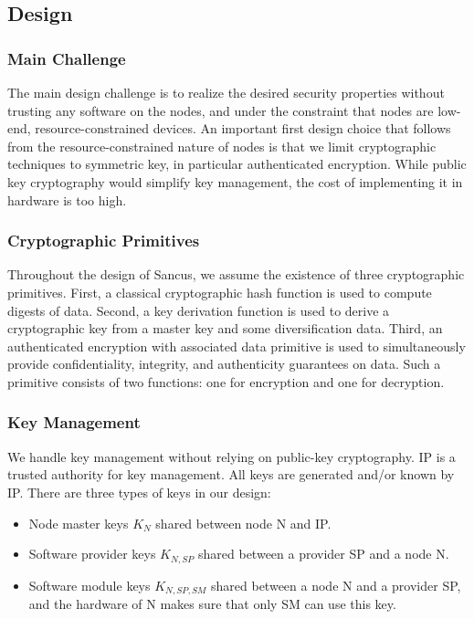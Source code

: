 \documentclass{article}
\begin{document}
\subsection{Design}

\subsubsection{Main Challenge}

The main design challenge is to realize the desired security properties without trusting any software on the nodes, and under the constraint that nodes are low-end, resource-constrained devices. An important first design choice that follows from the resource-constrained nature of nodes is that we limit cryptographic techniques to symmetric key, in particular authenticated encryption. While public key cryptography would simplify key management, the cost of implementing it in hardware is too high.

\subsubsection{Cryptographic Primitives}

Throughout the design of Sancus, we assume the existence of three cryptographic primitives. First, a classical cryptographic hash function is used to compute digests of data. Second, a key derivation function is used to derive a cryptographic key from a master key and some diversification data. Third, an authenticated encryption with associated data primitive is used to simultaneously provide confidentiality, integrity, and authenticity guarantees on data. Such a primitive consists of two functions: one for encryption and one for decryption.


\subsubsection{Key Management}

We handle key management without relying on public-key cryptography. IP is a trusted authority for key management. All keys are generated and/or known by IP. There are three types of keys in our design:

\begin{itemize}
\item Node master keys $K_N$ shared between node N and IP.
\item Software provider keys $K_{N,SP}$ shared between a provider SP and a node N.
\item Software module keys $K_{N,SP,SM}$ shared between a node N and a provider SP, and the hardware of N makes sure that only SM can use this key.
\end{itemize}
\end{document}
